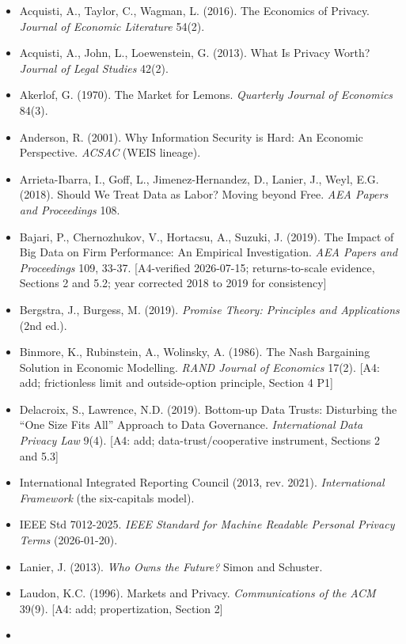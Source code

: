 \documentclass[
  11pt,
]{article}
\providecommand{\tightlist}{%
  \setlength{\itemsep}{0pt}\setlength{\parskip}{0pt}}
\begin{document}
\begin{itemize}
\tightlist
\item
  Acquisti, A., Taylor, C., Wagman, L. (2016). The Economics of Privacy.
  \emph{Journal of Economic Literature} 54(2).
\item
  Acquisti, A., John, L., Loewenstein, G. (2013). What Is Privacy Worth?
  \emph{Journal of Legal Studies} 42(2).
\item
  Akerlof, G. (1970). The Market for Lemons. \emph{Quarterly Journal of
  Economics} 84(3).
\item
  Anderson, R. (2001). Why Information Security is Hard: An Economic
  Perspective. \emph{ACSAC} (WEIS lineage).
\item
  Arrieta-Ibarra, I., Goff, L., Jimenez-Hernandez, D., Lanier, J., Weyl,
  E.G. (2018). Should We Treat Data as Labor? Moving beyond Free.
  \emph{AEA Papers and Proceedings} 108.
\item
  Bajari, P., Chernozhukov, V., Hortacsu, A., Suzuki, J. (2019). The
  Impact of Big Data on Firm Performance: An Empirical Investigation.
  \emph{AEA Papers and Proceedings} 109, 33-37. {[}A4-verified
  2026-07-15; returns-to-scale evidence, Sections 2 and 5.2; year
  corrected 2018 to 2019 for consistency{]}
\item
  Bergstra, J., Burgess, M. (2019). \emph{Promise Theory: Principles and
  Applications} (2nd ed.).
\item
  Binmore, K., Rubinstein, A., Wolinsky, A. (1986). The Nash Bargaining
  Solution in Economic Modelling. \emph{RAND Journal of Economics}
  17(2). {[}A4: add; frictionless limit and outside-option principle,
  Section 4 P1{]}
\item
  Delacroix, S., Lawrence, N.D. (2019). Bottom-up Data Trusts:
  Disturbing the ``One Size Fits All'' Approach to Data Governance.
  \emph{International Data Privacy Law} 9(4). {[}A4: add;
  data-trust/cooperative instrument, Sections 2 and 5.3{]}
\item
  International Integrated Reporting Council (2013, rev. 2021).
  \emph{International Framework} (the six-capitals model).
\item
  IEEE Std 7012-2025. \emph{IEEE Standard for Machine Readable Personal
  Privacy Terms} (2026-01-20).
\item
  Lanier, J. (2013). \emph{Who Owns the Future?} Simon and Schuster.
\item
  Laudon, K.C. (1996). Markets and Privacy. \emph{Communications of the
  ACM} 39(9). {[}A4: add; propertization, Section 2{]}
\item

\end{itemize}
\end{document}
